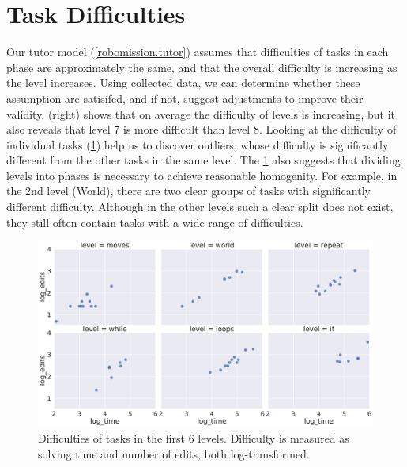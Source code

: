 \section{Task Difficulties}


Our tutor model (\cref{robomission.tutor}) assumes that difficulties of tasks
in each phase are approximately the same,
and that the overall difficulty is increasing as the level increases.   %
Using collected data, we can determine whether these assumption are satisifed,
and if not, suggest adjustments to improve their validity.
 (right) shows that on average the difficulty of levels
is increasing, but it also reveals that level 7 is more difficult than level 8.
Looking at the difficulty of individual tasks (\cref{fig:difficulties-tasks-levels})
help us to discover outliers, whose difficulty is significantly
different from the other tasks in the same level.
The \cref{fig:difficulties-tasks-levels} also suggests that dividing levels
into phases is necessary to achieve reasonable homogenity. For example, in the 2nd
level (World), there are two clear groups of tasks with significantly different
difficulty. Although in the other levels such a clear split does not exist,
they still often contain tasks with a wide range of difficulties.

\begin{figure}[htb]
\centering
\includegraphics[width=\textwidth]{img/difficulties-tasks-levels}
\caption{%
  Difficulties of tasks in the first 6 levels.
  Difficulty is measured as solving time and number of edits, both log-transformed.}
\label{fig:difficulties-tasks-levels}
\end{figure}

